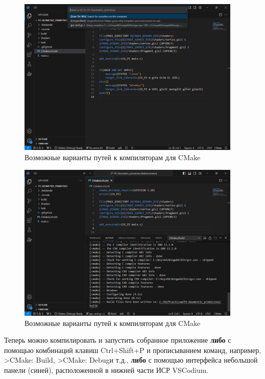 \documentclass[a4paper,12pt]{article}
\begin{document}
\begin{figure} [H]
	\centering
	\includegraphics[width=0.95\textwidth]{images/CMake_compiler_paths.png}
	\caption {Возможные варианты путей к компиляторам для CMake}
	\label{fig:CMake_compiler_paths}
\end{figure}

\begin{figure} [H]
	\centering
	\includegraphics[width=0.95\textwidth]{images/CMake_build.png}
	\caption {Возможные варианты путей к компиляторам для CMake}
	\label{fig:CMake_build}
\end{figure}

Теперь можно компилировать и запустить собранное приложение \textbf{либо} с помощью комбинаций клавиш Ctrl+Shift+P и прописыванием команд, например,  \textquotedbl>CMake: Build\textquotedbl, \textquotedbl >CMake: Debug\textquotedbl и т.д., \textbf{либо} с помощью интерфейса небольшой панели (синей), расположенной в нижней части ИСР VSCodium.
\end{document}
